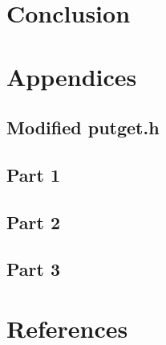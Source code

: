 \documentclass[12pt]{article}
\begin{document}
\section{Conclusion}

\section{Appendices}

\subsection{Modified putget.h}
	
\subsection{Part 1}
	
\subsection{Part 2}
	
\subsection{Part 3}
	
	
	
\section{References} 
\end{document}
